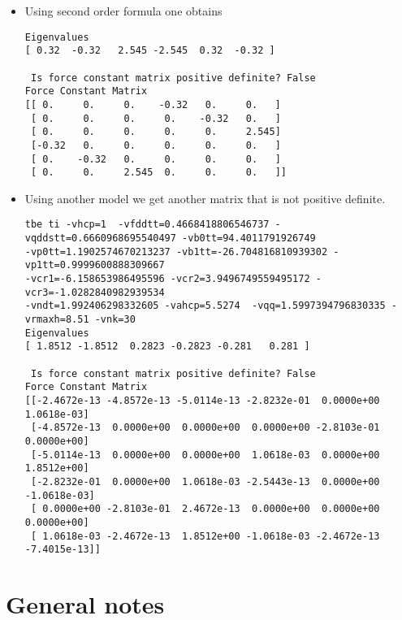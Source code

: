 \documentclass[11pt]{article}
\begin{document}
\begin{itemize}
\item Using second order formula one obtains
\begin{verbatim}
Eigenvalues
[ 0.32  -0.32   2.545 -2.545  0.32  -0.32 ]

 Is force constant matrix positive definite? False
Force Constant Matrix
[[ 0.     0.     0.    -0.32   0.     0.   ]
 [ 0.     0.     0.     0.    -0.32   0.   ]
 [ 0.     0.     0.     0.     0.     2.545]
 [-0.32   0.     0.     0.     0.     0.   ]
 [ 0.    -0.32   0.     0.     0.     0.   ]
 [ 0.     0.     2.545  0.     0.     0.   ]]

\end{verbatim}

\item Using another model we get another matrix that is not positive
definite. 
\begin{verbatim}
tbe ti -vhcp=1  -vfddtt=0.4668418806546737 -vqddstt=0.6660968695540497 -vb0tt=94.4011791926749 
-vp0tt=1.1902574670213237 -vb1tt=-26.704816810939302 -vp1tt=0.9999600888309667 
-vcr1=-6.158653986495596 -vcr2=3.9496749559495172 -vcr3=-1.0282840982939534 
-vndt=1.992406298332605 -vahcp=5.5274  -vqq=1.5997394796830335 -vrmaxh=8.51 -vnk=30 
Eigenvalues
[ 1.8512 -1.8512  0.2823 -0.2823 -0.281   0.281 ]

 Is force constant matrix positive definite? False
Force Constant Matrix
[[-2.4672e-13 -4.8572e-13 -5.0114e-13 -2.8232e-01  0.0000e+00  1.0618e-03]
 [-4.8572e-13  0.0000e+00  0.0000e+00  0.0000e+00 -2.8103e-01  0.0000e+00]
 [-5.0114e-13  0.0000e+00  0.0000e+00  1.0618e-03  0.0000e+00  1.8512e+00]
 [-2.8232e-01  0.0000e+00  1.0618e-03 -2.5443e-13  0.0000e+00 -1.0618e-03]
 [ 0.0000e+00 -2.8103e-01  2.4672e-13  0.0000e+00  0.0000e+00  0.0000e+00]
 [ 1.0618e-03 -2.4672e-13  1.8512e+00 -1.0618e-03 -2.4672e-13 -7.4015e-13]]
\end{verbatim}
\end{itemize}




\section{General notes}
\label{sec:org9b02dd5}
\end{document}
